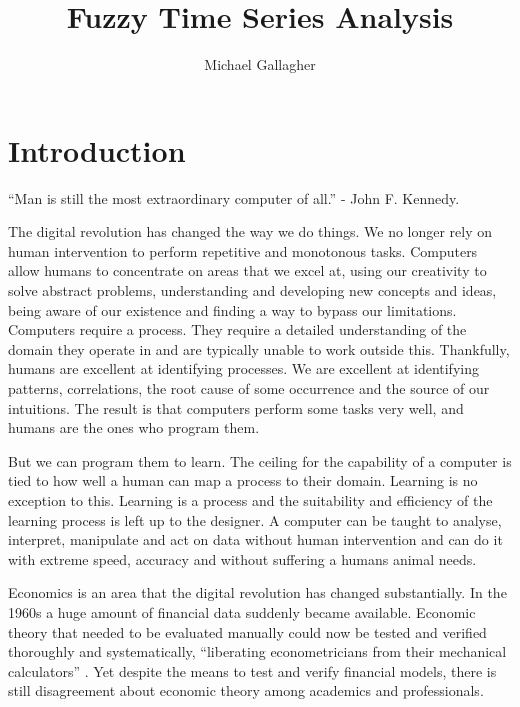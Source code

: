 \documentclass{article}
\title{Fuzzy Time Series Analysis}
\author{Michael Gallagher}
\theoremstyle{definition}
\begin{document}
\maketitle



\tableofcontents

\section{Introduction}

``Man is still the most extraordinary computer of all.'' - John F. Kennedy.

The digital revolution has changed the way we do things. We no longer rely on human intervention to perform repetitive and monotonous tasks. Computers allow humans to concentrate on areas that we excel at, using our creativity to solve abstract problems, understanding and developing new concepts and ideas, being aware of our existence and finding a way to bypass our limitations. Computers require a process. They require a detailed understanding of the domain they operate in and are typically unable to work outside this. Thankfully, humans are excellent at identifying processes. We are excellent at identifying patterns, correlations, the root cause of some occurrence and the source of our intuitions. The result is that computers perform some tasks very well, and humans are the ones who program them.

But we can program them to learn. The ceiling for the capability of a computer is tied to how well a human can map a process to their domain. Learning is no exception to this. Learning is a process \citep{rescorla1988pavlovian} and the suitability and efficiency of the learning process is left up to the designer. A computer can be taught to analyse, interpret, manipulate and act on data without human intervention and can do it with extreme speed, accuracy and without suffering a humans animal needs.

Economics is an area that the digital revolution has changed substantially. In the 1960s a huge amount of financial data suddenly became available. Economic theory that needed to be evaluated manually could now be tested and verified thoroughly and systematically, ``liberating econometricians from their mechanical calculators'' \citep{fama}. Yet despite the means to test and verify financial models, there is still disagreement about economic theory among academics and professionals.
\end{document}
